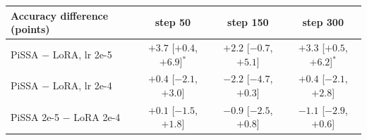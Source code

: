 \begin{tabular}{lccc}
\toprule
Accuracy difference (points) & step 50 & step 150 & step 300 \\
\midrule
PiSSA $-$ LoRA, lr 2e-5 & $+3.7$ [$+0.4$, $+6.9$]$^{*}$ & $+2.2$ [$-0.7$, $+5.1$] & $+3.3$ [$+0.5$, $+6.2$]$^{*}$ \\
PiSSA $-$ LoRA, lr 2e-4 & $+0.4$ [$-2.1$, $+3.0$] & $-2.2$ [$-4.7$, $+0.3$] & $+0.4$ [$-2.1$, $+2.8$] \\
PiSSA 2e-5 $-$ LoRA 2e-4 & $+0.1$ [$-1.5$, $+1.8$] & $-0.9$ [$-2.5$, $+0.8$] & $-1.1$ [$-2.9$, $+0.6$] \\
\bottomrule
\end{tabular}
